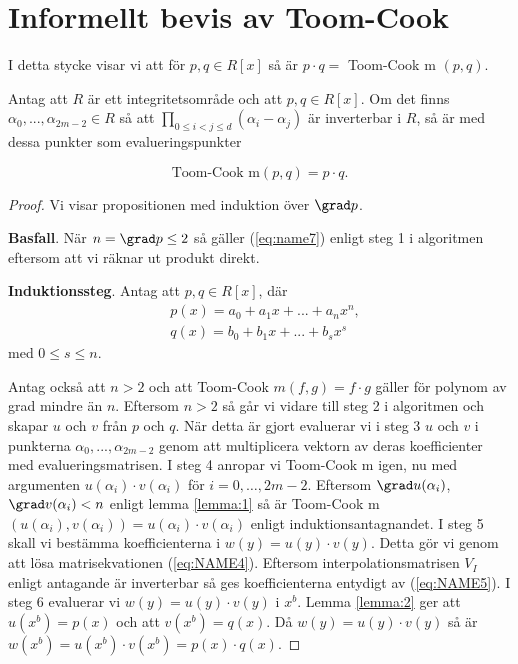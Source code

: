\section{Informellt bevis av Toom-Cook}
I detta stycke visar vi att för $p, q \in R[x]$ så är $p \cdot q =$ Toom-Cook m
$(p, q)$.

\begin{proposition}
  \label{prop:1}
  Antag att $R$ är ett integritetsområde och att $p, q \in R[x]$. Om det finns
  $\alpha_0, ...,  \alpha_{2m-2} \in R$ så att $ \prod_{0 \leq i < j \leq d}
  (\alpha_i - \alpha_j)$ är inverterbar i $R$, så är med dessa punkter som
  evalueringspunkter

  \begin{equation}
    \label{eq:name7}
    \text{Toom-Cook m} (p, q) =  p \cdot q.
  \end{equation}
\end{proposition}

\begin{proof}
Vi visar propositionen med induktion över $\grad p$.

\noindent\textbf{Basfall}. När $n = \grad p \leq 2$ så gäller (\ref{eq:name7})
enligt steg 1 i algoritmen eftersom att vi räknar ut produkt direkt.

\bigskip\noindent
\textbf{Induktionssteg}. Antag att $p, q \in R[x]$, där
\begin{align*}
  &p(x) = a_0 + a_1 x + ... + a_n x^n, \\
  &q(x) = b_0 + b_1 x + ... + b_s x^s
\end{align*}
med $0 \leq s \leq n$.

\bigskip\noindent
Antag också att $n > 2$ och att Toom-Cook $m (f, g) =  f \cdot g$ gäller för
polynom av grad mindre än $n$. Eftersom $n > 2$ så går vi vidare till steg 2 i
algoritmen och skapar $u$ och $v$ från $p$ och $q$. När detta är gjort
evaluerar vi i steg 3 $u$ och $v$ i punkterna $\alpha_0, ...,  \alpha_{2m-2}$
genom att multiplicera vektorn av deras koefficienter med evalueringsmatrisen.
I steg 4 anropar vi Toom-Cook m  igen, nu med argumenten $u(\alpha_i) \cdot
v(\alpha_i)$ för $i = 0, \ldots , 2m-2$. Eftersom $\grad u(\alpha_i)$, $\grad
v(\alpha_i) < n$ enligt lemma \ref{lemma:1} så är Toom-Cook m $(u(\alpha_i),
v(\alpha_i)) = u(\alpha_i) \cdot v(\alpha_i)$ enligt induktionsantagnandet. I
steg 5 skall vi bestämma koefficienterna i $w(y)=u(y) \cdot v(y)$. Detta gör vi
genom att lösa matrisekvationen (\ref{eq:NAME4}). Eftersom
interpolationsmatrisen $V_I$ enligt antagande är inverterbar så ges
koefficienterna entydigt av (\ref{eq:NAME5}). I steg 6 evaluerar vi $w(y)=u(y)
\cdot v(y)$ i $x^b$. Lemma \ref{lemma:2} ger att $u(x^b)=p(x)$ och att
$v(x^b)=q(x)$. Då $w(y)=u(y) \cdot v(y)$ så är $w(x^b)=u(x^b) \cdot v(x^b)=p(x)
\cdot q(x)$.
\end{proof}

